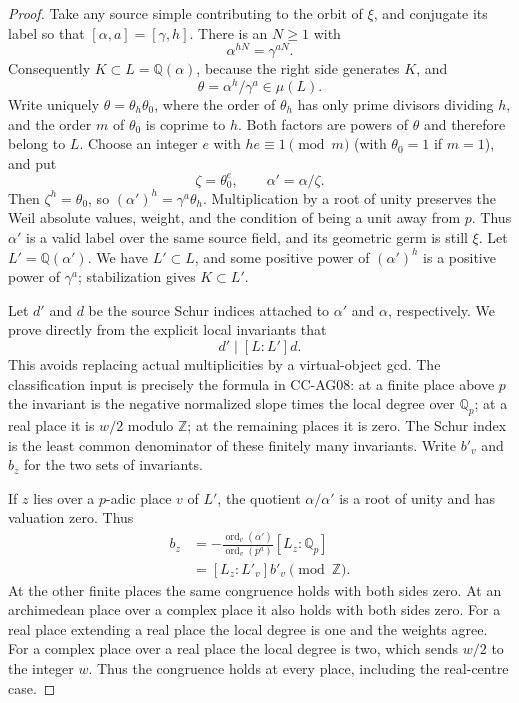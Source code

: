 \begin{proof}
Take any source simple contributing to the orbit of $\xi$, and conjugate
its label so that $[\alpha,a]=[\gamma,h]$. There is an $N\ge1$ with
\[
                      \alpha^{hN}=\gamma^{aN}.
                                                               \tag{PS.3}
\]
Consequently $K\subset L=\mathbb Q(\alpha)$, because the right side
generates $K$, and
\[
                         \theta=\alpha^h/\gamma^a\in\mu(L).
\]
Write uniquely $\theta=\theta_h\theta_0$, where the order of
$\theta_h$ has only prime divisors dividing $h$, and the order $m$ of
$\theta_0$ is coprime to $h$. Both factors are powers of $\theta$ and
therefore belong to $L$. Choose an integer $e$ with $he\equiv1\pmod m$
(with $\theta_0=1$ if $m=1$), and put
\[
                \zeta=\theta_0^e,\qquad \alpha'=\alpha/\zeta.
                                                               \tag{PS.4}
\]
Then $\zeta^h=\theta_0$, so $(\alpha')^h=\gamma^a\theta_h$.
Multiplication by a root of unity preserves the Weil absolute values,
weight, and the condition of being a unit away from $p$. Thus $\alpha'$
is a valid label over the same source field, and its geometric germ
is still $\xi$. Let $L'=\mathbb Q(\alpha')$. We have $L'\subset L$,
and some positive power of $(\alpha')^h$ is a positive power of
$\gamma^a$; stabilization gives $K\subset L'$.

Let $d'$ and $d$ be the source Schur indices attached to $\alpha'$
and $\alpha$, respectively. We prove directly from the explicit local
invariants that
\[
                              d'\mid[L:L']d.
                                                               \tag{PS.5}
\]
This avoids replacing actual multiplicities by a virtual-object gcd.
The classification input is precisely the formula in CC-AG08: at a
finite place above $p$ the invariant is the negative normalized slope
times the local degree over $\mathbb Q_p$; at a real place it is $w/2$
modulo $\mathbb Z$; at the remaining places it is zero. The Schur index
is the least common denominator of these finitely many invariants.
Write $b'_v$ and $b_z$ for the two sets of invariants.

If $z$ lies over a $p$-adic place $v$ of $L'$, the quotient
$\alpha/\alpha'$ is a root of unity and has valuation zero. Thus
\[
 \begin{split}
 b_z
   &=-\frac{\operatorname{ord}_v(\alpha')}{
                    \operatorname{ord}_v(p^a)}[L_z:\mathbb Q_p]\\
   &=[L_z:L'_v]b'_v\pmod{\mathbb Z}.
 \end{split}                                                   \tag{PS.6}
\]
At the other finite places the same congruence holds with both sides
zero. At an archimedean place over a complex place it also holds with
both sides zero. For a real place extending a real place the local
degree is one and the weights agree. For a complex place over a real
place the local degree is two, which sends $w/2$ to the integer $w$.
Thus the congruence holds at every place, including the real-centre case.


\end{proof}

